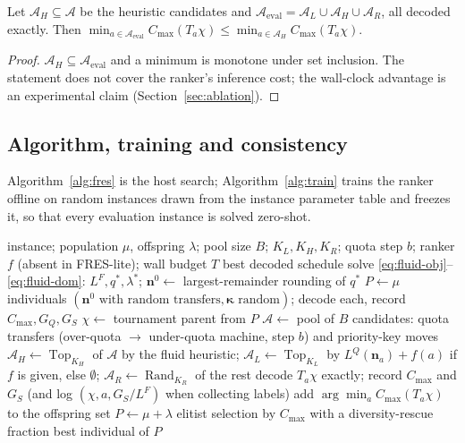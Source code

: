 \begin{proposition}\label{prop:safeguard}
Let $\mathcal{A}_H \subseteq \mathcal{A}$ be the heuristic candidates and $\mathcal{A}_{\mathrm{eval}} = \mathcal{A}_L \cup
\mathcal{A}_H \cup \mathcal{A}_R$, all decoded exactly. Then
$\min_{a \in \mathcal{A}_{\mathrm{eval}}} C_{\max}(T_a\chi) \le \min_{a \in \mathcal{A}_H} C_{\max}(T_a\chi)$.
\end{proposition}
\begin{proof}
$\mathcal{A}_H \subseteq \mathcal{A}_{\mathrm{eval}}$ and a minimum is monotone under set inclusion. The statement does not
cover the ranker's inference cost; the wall-clock advantage is an experimental claim (Section~\ref{sec:ablation}).
\end{proof}

\subsection{Algorithm, training and consistency}\label{sec:algorithm}
Algorithm~\ref{alg:fres} is the host search; Algorithm~\ref{alg:train} trains the ranker offline on random instances drawn
from the instance parameter table and freezes it, so that every evaluation instance is solved zero-shot.

\begin{algorithm}
\caption{FRES: fluid-residual evolutionary search}\label{alg:fres}
\begin{algorithmic}[1]
\Require instance; population $\mu$, offspring $\lambda$; pool size $B$; $K_L, K_H, K_R$; quota step $b$; ranker $f$ (absent in FRES-lite); wall budget $T$
\Ensure best decoded schedule
\State solve \eqref{eq:fluid-obj}--\eqref{eq:fluid-dom}: $L^F, q^*, \lambda^*$; $\mathbf{n}^0 \gets$ largest-remainder rounding of $q^*$
\State $P \gets \mu$ individuals $(\mathbf{n}^0 \text{ with random transfers}, \boldsymbol{\kappa} \text{ random})$; decode each, record $C_{\max}, G_Q, G_S$
    \State $\chi \gets$ tournament parent from $P$
    \State $\mathcal{A} \gets$ pool of $B$ candidates: quota transfers (over-quota $\to$ under-quota machine, step $b$) and priority-key moves
    \State $\mathcal{A}_H \gets \operatorname{Top}_{K_H}$ of $\mathcal{A}$ by the fluid heuristic; $\mathcal{A}_L \gets \operatorname{Top}_{K_L}$ by $L^Q(\mathbf{n}_a) + f(a)$ if $f$ is given, else $\emptyset$; $\mathcal{A}_R \gets \operatorname{Rand}_{K_R}$ of the rest
      \State decode $T_a\chi$ exactly; record $C_{\max}$ and $G_S$ (and log $(\chi, a, G_S/L^F)$ when collecting labels)
    \EndFor
    \State add $\arg\min_a C_{\max}(T_a\chi)$ to the offspring set
  \EndFor
  \State $P \gets \mu+\lambda$ elitist selection by $C_{\max}$ with a diversity-rescue fraction
\EndWhile
\State \Return best individual of $P$
\end{algorithmic}
\end{algorithm}

